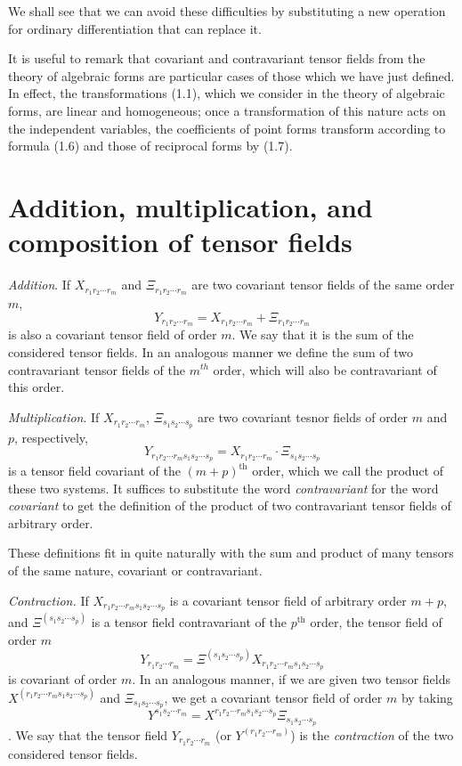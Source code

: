\documentclass{book}
\begin{document}
We shall see that we can avoid these difficulties by substituting a new operation for ordinary differentiation that can replace it.

It is useful to remark that covariant and contravariant tensor fields from the theory of algebraic forms are particular cases of those which we have just defined. In effect, the transformations (1.1), which we consider in the theory of algebraic forms, are linear and homogeneous; once a transformation of this nature acts on the independent variables, the coefficients of point forms transform according to formula (1.6) and those of reciprocal forms by (1.7).
\section{Addition, multiplication, and composition of tensor fields}
\emph{Addition}. If $X_{r_1r_2\cdots r_m}$ and $\Xi_{r_1r_2\cdots r_m}$ are two covariant tensor fields of the same order $m$,
$$Y_{r_1r_2\cdots r_m}=X_{r_1r_2\cdots r_m} + \Xi_{r_1r_2\cdots r_m}$$
is also a covariant tensor field of order $m$. We say that it is the sum of the considered tensor fields. In an analogous manner we define the sum of two contravariant tensor fields of the $m^{th}$ order, which will also be contravariant of this order.

\emph{Multiplication}. If $X_{r_1r_2\cdots r_m}$, $\Xi_{s_1s_2\cdots s_p}$ are two covariant tesnor fields of order $m$ and $p$, respectively, 
$$Y_{r_1r_2\cdots r_ms_1s_2\cdots s_p}=X_{r_1r_2\cdots r_m} \cdot \Xi_{s_1s_2\cdots s_p}$$
is a tensor field covariant of the $(m+p)^{\text{th}}$ order, which we call the product of these two systems. It suffices to substitute the word \emph{contravariant} for the word \emph{covariant} to get the definition of the product of two contravariant tensor fields of arbitrary order.

These definitions fit in quite naturally with the sum and product of many tensors of the same nature, covariant or contravariant.

\emph{Contraction.} If $X_{r_1r_2\cdots r_ms_1s_2\cdots s_p}$ is a covariant tensor field of arbitrary order $m+p$, and $\Xi^{(s_1s_2\cdots s_p)}$ is a tensor field contravariant of the $p^{\text{th}}$ order, the tensor field of order $m$
$$Y_{r_1r_2\cdots r_m}=\Xi^{(s_1s_2\cdots s_p)}X_{r_1r_2\cdots r_ms_1s_2\cdots s_p}$$
is covariant of order $m$. In an analogous manner, if we are given two tensor fields $X^{(r_1r_2\cdots r_ms_1s_2\cdots s_p)}$ and $\Xi_{s_1s_2\cdots s_p}$, we get a covariant tensor field of order $m$ by taking
$$Y^{s_1s_2\cdots r_m}=X^{r_1r_2\cdots r_ms_1s_2\cdots s_p}\Xi_{s_1s_2\cdots s_p}$$.
We say that the tensor field $Y_{r_1r_2\cdots r_m}$ (or $Y^{(r_1r_2\cdots r_m)}$) is the \emph{contraction} of the two considered tensor fields.
\end{document}
